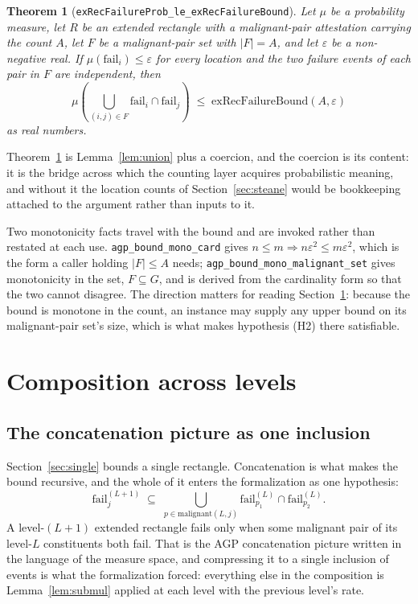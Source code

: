 \documentclass[aps,prx,reprint,nofootinbib,superscriptaddress]{revtex4-2}
\newtheorem{theorem}{Theorem}
\begin{document}
\begin{theorem}[\texttt{exRecFailureProb\_le\_exRecFailureBound}]
\label{thm:bridge}
Let $\mu$ be a probability measure, let $R$ be an extended rectangle with a
malignant-pair attestation carrying the count $A$, let $F$ be a malignant-pair
set with $|F| = A$, and let $\varepsilon$ be a non-negative real. If
$\mu(\mathrm{fail}_i) \le \varepsilon$ for every location and the two failure
events of each pair in $F$ are independent, then
\begin{equation}
  \mu\!\left(\bigcup_{(i,j) \in F} \mathrm{fail}_i \cap \mathrm{fail}_j\right)
    \;\le\; \mathrm{exRecFailureBound}(A, \varepsilon)
  \label{eq:bridge}
\end{equation}
as real numbers.
\end{theorem}

Theorem~\ref{thm:bridge} is Lemma~\ref{lem:union} plus a coercion, and the
coercion is its content: it is the bridge across which the counting layer
acquires probabilistic meaning, and without it the location counts of
Section~\ref{sec:steane} would be bookkeeping attached to the argument rather
than inputs to it.

Two monotonicity facts travel with the bound and are invoked rather than
restated at each use. \texttt{agp\_bound\_mono\_card} gives $n \le m
\Rightarrow n\varepsilon^2 \le m\varepsilon^2$, which is the form a caller
holding $|F| \le A$ needs; \texttt{agp\_bound\_mono\_malignant\_set} gives
monotonicity in the set, $F \subseteq G$, and is derived from the cardinality
form so that the two cannot disagree. The direction matters for reading
Section~\ref{sec:levels}: because the bound is monotone in the count, an
instance may supply any upper bound on its malignant-pair set's size, which is
what makes hypothesis (H2) there satisfiable.

\section{Composition across levels}
\label{sec:levels}

\subsection{The concatenation picture as one inclusion}

Section~\ref{sec:single} bounds a single rectangle. Concatenation is what makes
the bound recursive, and the whole of it enters the formalization as one
hypothesis:
\begin{equation}
  \mathrm{fail}^{(L+1)}_j \;\subseteq\;
  \bigcup_{p \in \mathrm{malignant}(L,j)}
    \mathrm{fail}^{(L)}_{p_1} \cap \mathrm{fail}^{(L)}_{p_2}.
  \label{eq:hstruct}
\end{equation}
A level-$(L{+}1)$ extended rectangle fails only when some malignant pair of its
level-$L$ constituents both fail. That is the AGP concatenation picture written
in the language of the measure space, and compressing it to a single inclusion
of events is what the formalization forced: everything else in the composition is
Lemma~\ref{lem:submul} applied at each level with the previous level's rate.
\end{document}
